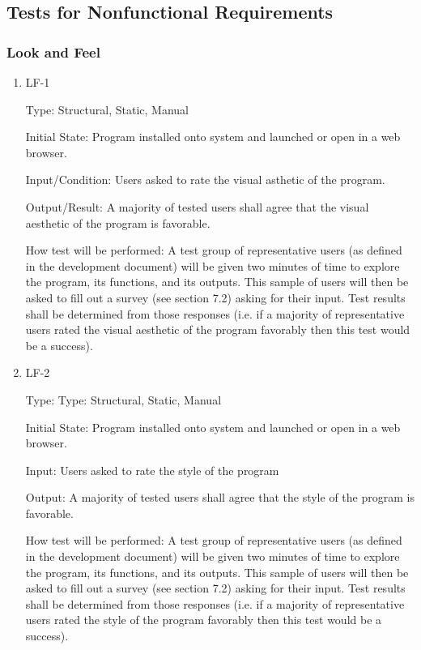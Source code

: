 \documentclass[12pt, titlepage]{article}
\begin{document}
\subsection{Tests for Nonfunctional Requirements}

\subsubsection{Look and Feel}

\begin{enumerate}

\item{LF-1\\}

Type: Structural, Static, Manual
					
Initial State: Program installed onto system and launched or open in a web browser.
					
Input/Condition: Users asked to rate the visual asthetic of the program.
					
Output/Result: A majority of tested users shall agree that the visual aesthetic of the program is favorable.
					
How test will be performed: A test group of representative users (as defined in the development document) will be given two minutes of time to explore the program, its functions, and its outputs. This sample of users will then be asked to fill out a survey (see section 7.2) asking for their input. Test results shall be determined from those responses (i.e. if a majority of representative users rated the visual aesthetic of the program favorably then this test would be a success).
					
\item{LF-2\\}

Type: Type: Structural, Static, Manual
					
Initial State: Program installed onto system and launched or open in a web browser.
					
Input: Users asked to rate the style of the program
					
Output: A majority of tested users shall agree that the style of the program is favorable.
					
How test will be performed: A test group of representative users (as defined in the development document) will be given two minutes of time to explore the program, its functions, and its outputs. This sample of users will then be asked to fill out a survey (see section 7.2) asking for their input. Test results shall be determined from those responses (i.e. if a majority of representative users rated the style of the program favorably then this test would be a success).

\end{enumerate}
\end{document}
